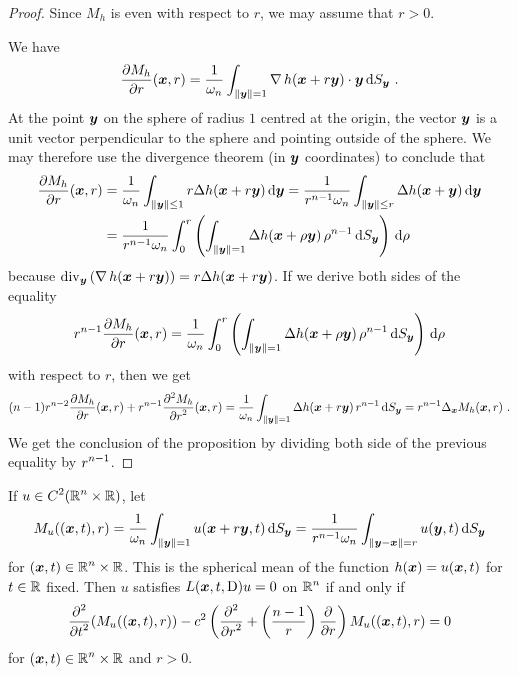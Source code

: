 \begin{proof}
Since $M_h$ is even with respect to $r$, we may assume that $r>0$.

We have
\[
\pdydx{M_h}{r}(\VEC{x},r)
= \frac{1}{\omega_n} \int_{\|\VEC{y}\|=1} \graD h(\VEC{x} + r \VEC{y})
\cdot \VEC{y} \dss{S}{y} \ .
\]
At the point $\VEC{y}$ on the sphere of radius $1$ centred at the
origin, the vector $\VEC{y}$ is a unit vector perpendicular to 
the sphere and pointing outside of the sphere.  We may therefore use
the divergence theorem (in $\VEC{y}$ coordinates) to conclude that
\begin{align*}
\pdydx{M_h}{r}(\VEC{x},r)
&= \frac{1}{\omega_n} \int_{\|\VEC{y}\|\leq 1} r \Delta h(\VEC{x} + r \VEC{y}) 
\dx{\VEC{y}}
= \frac{1}{r^{n-1} \omega_n} \int_{\|\VEC{y}\|\leq r} \Delta h(\VEC{x}+\VEC{y}) 
\dx{\VEC{y}} \\
&= \frac{1}{r^{n-1} \omega_n} \int_0^r \left( \int_{\|\VEC{y}\|= 1}
\Delta h(\VEC{x} + \rho \VEC{y}) \, \rho^{n-1} \dss{S}{y} \right) \dx{\rho}
\end{align*}
because
$\DS \diV_{\VEC{y}} \left( \graD h(\VEC{x} + r \VEC{y}) \right)
= r \Delta h(\VEC{x} + r \VEC{y})$.
If we derive both sides of the equality
\[
r^{n-1} \pdydx{M_h}{r}(\VEC{x},r) =
\frac{1}{\omega_n} \int_0^r \left( \int_{\|\VEC{y}\|= 1}
\Delta h(\VEC{x} + \rho \VEC{y})\, \rho^{n-1} \dss{S}{y} \right) \dx{\rho}
\]
with respect to $r$, then we get
\[
(n-1) r^{n-2} \pdydx{M_h}{r}(\VEC{x},r) 
+ r^{n-1} \pdydxn{M_h}{r}{2}(\VEC{x},r) 
= \frac{1}{\omega_n} \int_{\|\VEC{y}\|= 1}
\Delta h(\VEC{x} + r \VEC{y}) \, r^{n-1} \dss{S}{y}
= r^{n-1} \Delta_{\VEC{x}} M_h(\VEC{x},r) \ .
\]
We get the conclusion of the proposition by dividing both side of the
previous equality by $\DS r^{n-1}$.
\end{proof}

\begin{cor} %
If $\DS u \in C^2(\RR^n \times \RR)$, let  \label{wave_sol_oaCOR}
\[
M_u( (\VEC{x},t), r) =
\frac{1}{\omega_n} \int_{\|\VEC{y}\|=1} u(\VEC{x} + r \VEC{y},t) 
\dss{S}{y}
= \frac{1}{r^{n-1} \omega_n}
\int_{\|\VEC{y}-\VEC{x}\|=r} u(\VEC{y},t) \dss{S}{y}
\]
for $\DS (\VEC{x},t) \in \RR^n \times \RR$.  This is the
spherical mean of the function $h(\VEC{x}) = u(\VEC{x},t)$ for
$t\in \RR$ fixed.  Then 
$u$ satisfies $\DS L(\VEC{x},t,\diff)u=0$ on
$\DS \RR^n$ if and only if
\begin{equation} \label{wave_sol_oa}
\pdfdxn{ \left(
M_u((\VEC{x},t),r)\right) }{t}{2} \\
- c^2 \left( \pdydxn{}{r}{2} + \left(\frac{n-1}{r}\right) \pdydx{}{r} \right)
M_u((\VEC{x},t),r) = 0
\end{equation}
for $\DS (\VEC{x},t) \in \RR^n \times \RR$ and $r>0$.
\end{cor}


